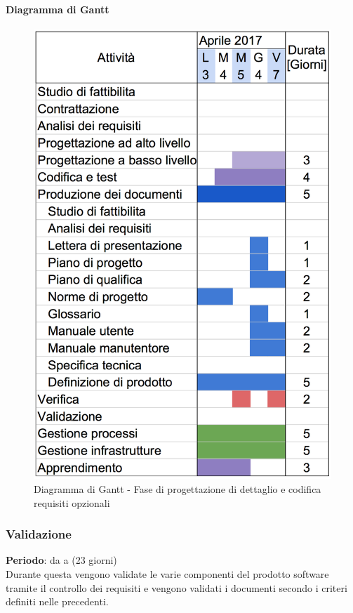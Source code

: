 		\paragraph{Diagramma di Gantt}
		\begin{figure}[H]
			\centering
			\includegraphics[height=0.45\textheight]{img/Gantt/f5c.png}
			\caption{Diagramma di Gantt - Fase di progettazione di dettaglio e codifica requisiti opzionali}
		\end{figure}
	\subsubsection {Validazione}
		\textbf{Periodo}: da  a  (23 giorni) \\
		Durante questa  vengono validate le varie componenti del prodotto software tramite il controllo dei requisiti e vengono validati i documenti secondo i criteri definiti nelle  precedenti.
